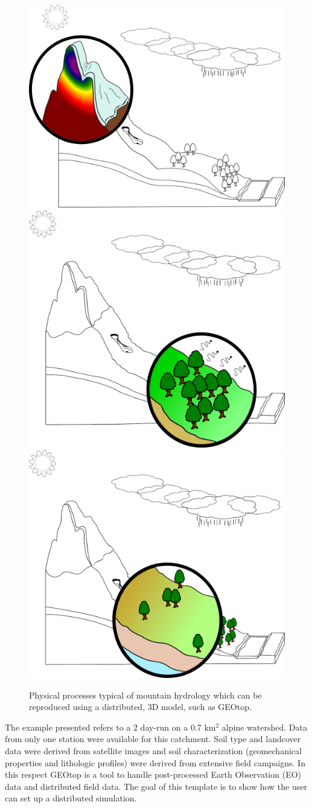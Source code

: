 \begin{figure}[h!]
\begin{center}
{\includegraphics[width=.48\columnwidth]{./images/pic_template/criosfera_temp_grad.png}} \quad
{\includegraphics[width=.48\columnwidth]{./images/pic_template/vegetazione.pdf}} \\
{\includegraphics[width=.48\columnwidth]{./images/pic_template/suolo.pdf}} \quad
\caption{Physical processes typical of mountain hydrology which can be reproduced using a distributed, 3D model, such as GEOtop.}
\label{processi3D}
\end{center}
\end{figure}

The example presented refers to a 2 day-run on a 0.7 km$^2$ alpine watershed. Data from only one station were available for this catchment. Soil type and landcover data were derived from satellite images and soil characterization (geomechanical properties and lithologic profiles) were derived from extensive field campaigns. In this respect GEOtop is a tool to handle post-processed Earth Observation (EO) data and distributed field data.
The goal of this template is to show how the user can set up a distributed simulation.


